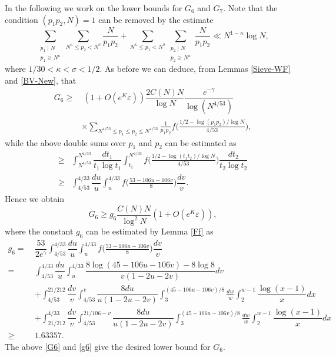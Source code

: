 \documentclass[12pt, a4paper]{amsart}
\def\leq{\leqslant}
\def\le{\leqslant}
\def\ge{\geqslant}
\theoremstyle{plain}
\theoremstyle{remark}
\numberwithin{equation}{section}
\begin{document}
In the following we work on the lower bounds for $G_6$ and $G_7$. 
Note that the condition $(p_{1}p_{2},N)=1$ can be removed by the estimate 
\begin{equation}
\sum_{\substack{p_{1}\mid N\\ p_{1}\ge N^{\kappa}}}\sum_{N^{\kappa}\le p_{2}<N^{\sigma}}\frac{N}{p_{1}p_{2}}+\sum_{N^{\kappa}\le p_{1}<N^{\sigma}}\sum_{\substack{p_{2}\mid N\\ p_{2}\ge N^{\kappa}}}\frac{N}{p_{1}p_{2}}\ll N^{1-\kappa}\log N,
\end{equation}
where $1/30<\kappa<\sigma<1/2$. As before we can deduce, from Lemmas \ref{Sieve-WF} and \ref{BV-New}, that
\begin{equation*}
\begin{aligned}
G_6
\ge &\   
(1+O(e^K\varepsilon))\dfrac{2C(N)N}{\log N}\dfrac{e^{-\gamma}}{\log (N^{4/53})}\\ 
&\times \sum_{N^{4/53} \leq p_1 \le p_2 \le N^{4/33}} \frac{1}{p_1p_2}f\bigg(\frac{1/2-\log (p_1p_2)/\log N}{4/53}\bigg), 
\end{aligned}
\end{equation*}
while the above double sums over $p_1$ and $p_2$ can be estimated as 
\begin{equation*}
\begin{aligned}
\ge & \int_{N^{4/53}}^{N^{4/33}} \dfrac{dt_1}{t_1\log t_1}\int_{t_1}^{N^{4/33}}f\bigg(\frac{1/2-\log (t_1t_2)/\log N}{4/53}\bigg)\dfrac{dt_2}{t_2\log t_2}\\
\ge & \int_{4/53}^{4/33}\dfrac{du}{u}\int_{u}^{4/33} f\bigg(\frac{53-106u-106v}{8}\bigg)\dfrac{dv}{v}. 
\end{aligned}
\end{equation*}
Hence we obtain 
\begin{equation}\label{G6}
G_6 \ge g_6\dfrac{C(N)N}{\log^2 N} (1+O(e^K\varepsilon)),
\end{equation}
where the constant $g_6$ can be estimated by Lemma \ref{Ff} as 
\begin{equation}\label{g6}
\begin{aligned}
g_{6}=\ & \dfrac{53}{2e^{\gamma}}\int_{4/53}^{4/33}\dfrac{du}{u}\int_{u}^{4/33}f\bigg(\frac{53-106u-106v}{8}\bigg)\dfrac{dv}{v}\\
=\ &\int_{4/53}^{4/33}\dfrac{du}{u}\int_{u}^{4/33} \dfrac{8\log (45-106u-106v)-8\log 8}{v(1-2u-2v)}dv\\
&+\int_{4/53}^{21/212}\dfrac{dv}{v}\int_{4/53}^{v} \dfrac{8du}{u(1-2u-2v)}\int_3^{(45-106u-106v)/8} \frac{dw}{w} \int_{2}^{w-1}\dfrac{\log (x-1)}{x}dx\\
&+\int_{21/212}^{4/33}\dfrac{dv}{v}\int_{4/53}^{21/106-v} \dfrac{8du}{u(1-2u-2v)}\int_3^{(45-106u-106v)/8} \frac{dw}{w} \int_{2}^{w-1}\dfrac{\log (x-1)}{x}dx\\
\ge\ & 1.63357. 
\end{aligned}
\end{equation}
The above \eqref{G6} and \eqref{g6} give the desired lower bound for $G_6$. 
\end{document}
